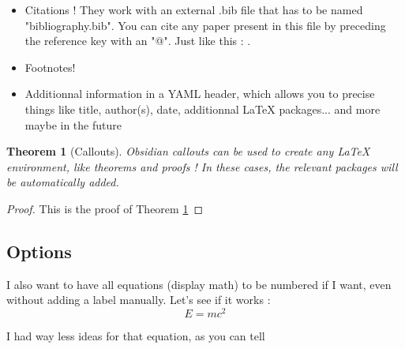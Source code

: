 \documentclass{article}
\newtheorem{theorem}{Theorem}
\begin{document}
\begin{maincontent}
\begin{itemize}
\item 
Citations ! They work with an external .bib file that has to be named "bibliography.bib". You can cite any paper present in this file by preceding the reference key with an "@". Just like this : \cite{Einstein}.

\item 
Footnotes\footnotemark[1] !

\item 
Additionnal information in a YAML header, which allows you to precise things like title, author(s), date, additionnal LaTeX packages... and more maybe in the future

\end{itemize}
\begin{theorem}[Callouts]

Obsidian callouts can be used to create any LaTeX environment, like theorems and proofs ! In these cases, the relevant packages will be automatically added.\label{main-theorem}
\end{theorem}
\begin{proof}

This is the proof of Theorem \ref{main-theorem}
\end{proof}

\subsection{Options}

I also want to have all equations (display math) to be numbered if I want, even without adding a label manually. Let's see if it works :
\begin{equation}
	E=mc^2
\end{equation}


I had way less ideas for that equation, as you can tell

\n

\end{maincontent}
\printbibliography
\end{document}
